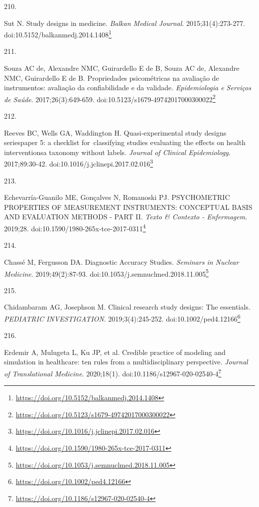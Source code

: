 \documentclass[
  a4paper,
]{book}
\newlength{\cslhangindent}
\newlength{\csllabelwidth}
\newlength{\cslentryspacingunit} %
\newenvironment{CSLReferences}[2] %
 {%
  \setlength{\parindent}{0pt}
  \ifodd #1
  \let\oldpar\par
  \def\par{\hangindent=\cslhangindent\oldpar}
  \fi
  \setlength{\parskip}{#2\cslentryspacingunit}
 }%
 {}
\newcommand{\CSLLeftMargin}[1]{\parbox[t]{\csllabelwidth}{#1}}
\newcommand{\CSLRightInline}[1]{\parbox[t]{\linewidth - \csllabelwidth}{#1}\break}
\renewcommand{\href}[2]{#2\footnote{\url{#1}}}
\begin{document}
\begin{CSLReferences}{0}{0}
\leavevmode{}%
\CSLLeftMargin{210. }%
\CSLRightInline{Sut N. Study designs in medicine. \emph{Balkan Medical Journal}. 2015;31(4):273-277. doi:\href{https://doi.org/10.5152/balkanmedj.2014.1408}{10.5152/balkanmedj.2014.1408}}

\leavevmode{}%
\CSLLeftMargin{211. }%
\CSLRightInline{Souza AC de, Alexandre NMC, Guirardello E de B, Souza AC de, Alexandre NMC, Guirardello E de B. Propriedades psicométricas na avaliação de instrumentos: avaliação da confiabilidade e da validade. \emph{Epidemiologia e Serviços de Saúde}. 2017;26(3):649-659. doi:\href{https://doi.org/10.5123/s1679-49742017000300022}{10.5123/s1679-49742017000300022}}

\leavevmode{}%
\CSLLeftMargin{212. }%
\CSLRightInline{Reeves BC, Wells GA, Waddington H. Quasi-experimental study designs series{\textemdash}paper 5: a checklist for~classifying studies evaluating the effects on health interventions{\textemdash}a taxonomy without labels. \emph{Journal of Clinical Epidemiology}. 2017;89:30-42. doi:\href{https://doi.org/10.1016/j.jclinepi.2017.02.016}{10.1016/j.jclinepi.2017.02.016}}

\leavevmode{}%
\CSLLeftMargin{213. }%
\CSLRightInline{Echevarría-Guanilo ME, Gonçalves N, Romanoski PJ. PSYCHOMETRIC PROPERTIES OF MEASUREMENT INSTRUMENTS: CONCEPTUAL BASIS AND EVALUATION METHODS - PART II. \emph{Texto \& Contexto - Enfermagem}. 2019;28. doi:\href{https://doi.org/10.1590/1980-265x-tce-2017-0311}{10.1590/1980-265x-tce-2017-0311}}

\leavevmode{}%
\CSLLeftMargin{214. }%
\CSLRightInline{Chassé M, Fergusson DA. Diagnostic Accuracy Studies. \emph{Seminars in Nuclear Medicine}. 2019;49(2):87-93. doi:\href{https://doi.org/10.1053/j.semnuclmed.2018.11.005}{10.1053/j.semnuclmed.2018.11.005}}

\leavevmode{}%
\CSLLeftMargin{215. }%
\CSLRightInline{Chidambaram AG, Josephson M. Clinical research study designs: The essentials. \emph{PEDIATRIC INVESTIGATION}. 2019;3(4):245-252. doi:\href{https://doi.org/10.1002/ped4.12166}{10.1002/ped4.12166}}

\leavevmode{}%
\CSLLeftMargin{216. }%
\CSLRightInline{Erdemir A, Mulugeta L, Ku JP, et al. Credible practice of modeling and simulation in healthcare: ten rules from a multidisciplinary perspective. \emph{Journal of Translational Medicine}. 2020;18(1). doi:\href{https://doi.org/10.1186/s12967-020-02540-4}{10.1186/s12967-020-02540-4}}


\end{CSLReferences}
\end{document}
